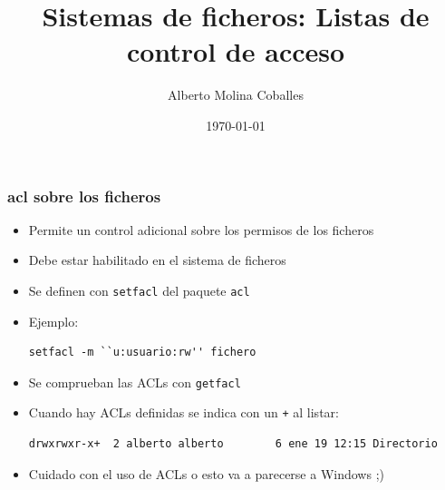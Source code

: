 \documentclass[aspectratio=169]{beamer}
\author{Alberto Molina Coballes}
\title{Sistemas de ficheros: Listas de control de acceso}
\institute{IES Gonzalo Nazareno}
\date{\today}
\begin{document}
\def\braces#1{[#1]}

\begin{frame}[t,plain]
\titlepage
\end{frame}

\begin{frame}[fragile]
  \frametitle{acl sobre los ficheros}
  \begin{itemize}
  \item Permite un control adicional sobre los permisos de los ficheros
  \item Debe estar habilitado en el sistema de ficheros
  \item Se definen con \texttt{setfacl} del paquete \texttt{acl}
  \item Ejemplo:
\footnotesize{
\begin{verbatim}
setfacl -m ``u:usuario:rw'' fichero      
\end{verbatim}}
  \item Se comprueban las ACLs con \texttt{getfacl}
  \item Cuando hay ACLs definidas se indica con un \texttt{+} al listar:
\footnotesize{
\begin{verbatim}
drwxrwxr-x+  2 alberto alberto        6 ene 19 12:15 Directorio
    \end{verbatim}}
  \item Cuidado con el uso de ACLs o esto va a parecerse a Windows ;)
  \end{itemize}
\end{frame}
\end{document}
